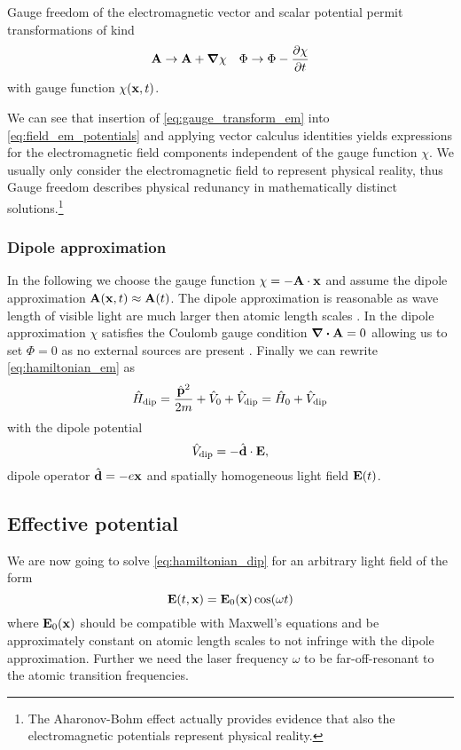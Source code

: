 Gauge freedom of the electromagnetic vector and scalar potential permit
transformations of kind
\begin{align}
  \vb{A}\to\vb{A}+\grad{\chi}
  &&
  \Phi\to\Phi-\pdv{\chi}{t}
  \label{eq:gauge_transform_em}
\end{align}
with gauge function $\chi(\vb{x},t)$.

We can see that insertion of \cref{eq:gauge_transform_em} into
\cref{eq:field_em_potentials} and applying vector calculus identities yields
expressions for the electromagnetic field components independent of the gauge
function $\chi$. We usually only consider the electromagnetic field to
represent physical reality, thus Gauge freedom describes physical redunancy
in mathematically distinct solutions.\footnote{The Aharonov-Bohm effect
actually provides evidence that also the electromagnetic potentials represent
physical reality.}

\subsubsection{Dipole approximation}

In the following we choose the gauge function $\chi=-\vb{A}\cdot\vb{x}$ and
assume the dipole approximation $\vb{A}(\vb{x},t)\approx\vb{A}(t)$. The
dipole approximation is reasonable as wave length of visible light are much
larger then atomic length scales \cite{Gerry2004}. In the dipole
approximation $\chi$ satisfies the Coulomb gauge condition
$\divergence{\vb{A}}=0$ allowing us to set $\Phi=0$ as no external sources
are present \cite{Jackson2005}. Finally we can rewrite
\cref{eq:hamiltonian_em} as
\begin{equation}
  \hat{H}_\text{dip}
  =\frac{\hat{\vb{p}}^2}{2m}+\hat{V}_0+\hat{V}_\text{dip}
  =\hat{H}_0+\hat{V}_\text{dip}
  \label{eq:hamiltonian_dip}
\end{equation}
with the dipole potential
\begin{equation}
  \hat{V}_\text{dip}
  =-\hat{\vb{d}}\cdot\vb{E}
  \label{eq:potential_dip},
\end{equation}
dipole operator $\hat{\vb{d}}=-e\vb{x}$ and spatially homogeneous light
field $\vb{E}(t)$.

\subsection{Effective potential}

We are now going to solve \cref{eq:hamiltonian_dip} for an arbitrary light
field of the form
\begin{equation}
  \vb{E}(t,\vb{x})
  =\vb{E}_0(\vb{x})\cos(\omega t)
  \label{eq:light_field}
\end{equation}
where $\vb{E}_0(\vb{x})$ should be compatible with Maxwell's equations and
be approximately constant on atomic length scales to not infringe with the
dipole approximation. Further we need the laser frequency $\omega$ to be
far-off-resonant to the atomic transition frequencies.

